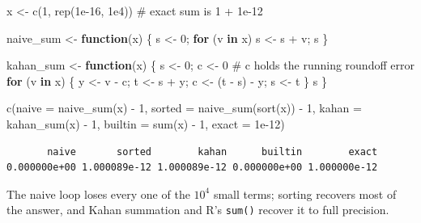 \documentclass[
  letterpaper,
  DIV=11,
  numbers=noendperiod]{scrreprt}
\newenvironment{Shaded}{\begin{snugshade}}{\end{snugshade}}
\newcommand{\AttributeTok}[1]{\textcolor[rgb]{0.40,0.45,0.13}{#1}}
\newcommand{\CommentTok}[1]{\textcolor[rgb]{0.37,0.37,0.37}{#1}}
\newcommand{\ControlFlowTok}[1]{\textcolor[rgb]{0.00,0.23,0.31}{\textbf{#1}}}
\newcommand{\DecValTok}[1]{\textcolor[rgb]{0.68,0.00,0.00}{#1}}
\newcommand{\FloatTok}[1]{\textcolor[rgb]{0.68,0.00,0.00}{#1}}
\newcommand{\FunctionTok}[1]{\textcolor[rgb]{0.28,0.35,0.67}{#1}}
\newcommand{\NormalTok}[1]{\textcolor[rgb]{0.00,0.23,0.31}{#1}}
\newcommand{\OtherTok}[1]{\textcolor[rgb]{0.00,0.23,0.31}{#1}}
\newcommand{\SpecialCharTok}[1]{\textcolor[rgb]{0.37,0.37,0.37}{#1}}
\begin{document}
\begin{Shaded}
\begin{Highlighting}[]
\NormalTok{x }\OtherTok{\textless{}{-}} \FunctionTok{c}\NormalTok{(}\DecValTok{1}\NormalTok{, }\FunctionTok{rep}\NormalTok{(}\FloatTok{1e{-}16}\NormalTok{, }\FloatTok{1e4}\NormalTok{))                 }\CommentTok{\# exact sum is 1 + 1e{-}12}

\NormalTok{naive\_sum }\OtherTok{\textless{}{-}} \ControlFlowTok{function}\NormalTok{(x) \{ s }\OtherTok{\textless{}{-}} \DecValTok{0}\NormalTok{; }\ControlFlowTok{for}\NormalTok{ (v }\ControlFlowTok{in}\NormalTok{ x) s }\OtherTok{\textless{}{-}}\NormalTok{ s }\SpecialCharTok{+}\NormalTok{ v; s \}}

\NormalTok{kahan\_sum }\OtherTok{\textless{}{-}} \ControlFlowTok{function}\NormalTok{(x) \{}
\NormalTok{  s }\OtherTok{\textless{}{-}} \DecValTok{0}\NormalTok{; c }\OtherTok{\textless{}{-}} \DecValTok{0}                            \CommentTok{\# c holds the running roundoff error}
  \ControlFlowTok{for}\NormalTok{ (v }\ControlFlowTok{in}\NormalTok{ x) \{ y }\OtherTok{\textless{}{-}}\NormalTok{ v }\SpecialCharTok{{-}}\NormalTok{ c; t }\OtherTok{\textless{}{-}}\NormalTok{ s }\SpecialCharTok{+}\NormalTok{ y; c }\OtherTok{\textless{}{-}}\NormalTok{ (t }\SpecialCharTok{{-}}\NormalTok{ s) }\SpecialCharTok{{-}}\NormalTok{ y; s }\OtherTok{\textless{}{-}}\NormalTok{ t \}}
\NormalTok{  s \}}

\FunctionTok{c}\NormalTok{(}\AttributeTok{naive   =} \FunctionTok{naive\_sum}\NormalTok{(x) }\SpecialCharTok{{-}} \DecValTok{1}\NormalTok{,}
  \AttributeTok{sorted  =} \FunctionTok{naive\_sum}\NormalTok{(}\FunctionTok{sort}\NormalTok{(x)) }\SpecialCharTok{{-}} \DecValTok{1}\NormalTok{,}
  \AttributeTok{kahan   =} \FunctionTok{kahan\_sum}\NormalTok{(x) }\SpecialCharTok{{-}} \DecValTok{1}\NormalTok{,}
  \AttributeTok{builtin =} \FunctionTok{sum}\NormalTok{(x) }\SpecialCharTok{{-}} \DecValTok{1}\NormalTok{,}
  \AttributeTok{exact   =} \FloatTok{1e{-}12}\NormalTok{)}
\end{Highlighting}
\end{Shaded}

\begin{verbatim}
       naive       sorted        kahan      builtin        exact 
0.000000e+00 1.000089e-12 1.000089e-12 0.000000e+00 1.000000e-12 
\end{verbatim}

The naive loop loses every one of the \(10^4\) small terms; sorting
recovers most of the answer, and Kahan summation and R's \texttt{sum()}
recover it to full precision.
\end{document}
